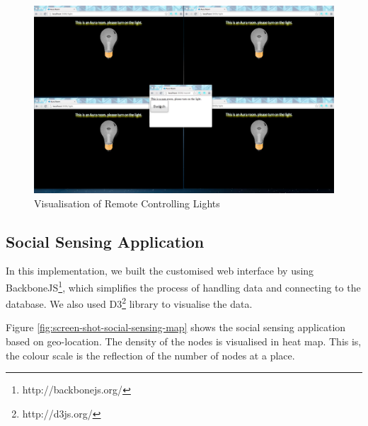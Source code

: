 \begin{appendices}
\begin{figure}[t]
  \begin{center}
    \includegraphics[width=1\textwidth]{images/screen-shot-home-auto-2.pdf}
    \caption{Visualisation of Remote Controlling Lights}
    \label{fig:screen-shot-home-auto-2}
  \end{center}
\end{figure}

\subsection{Social Sensing Application}

In this implementation, we built the customised web interface by using BackboneJS\footnote{http://backbonejs.org/}, which simplifies the process of handling data and connecting to the database. We also used D3\footnote{http://d3js.org/} library to visualise the data.

Figure \ref{fig:screen-shot-social-sensing-map} shows the social sensing application based on geo-location. The density of the nodes is visualised in heat map. This is, the colour scale is the reflection of the number of nodes at a place.


\end{appendices}
